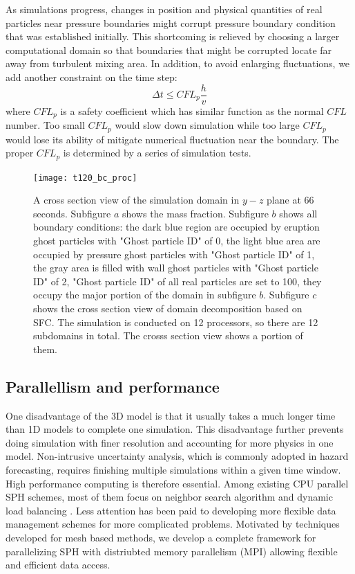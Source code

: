 \documentclass[gmd, manuscript]{copernicus}
\begin{document}
As simulations progress, changes in position and physical quantities of real particles near pressure boundaries might corrupt pressure boundary condition that was established initially. This shortcoming is relieved by choosing a larger computational domain so that boundaries that might be corrupted locate far away from turbulent mixing area. In addition, to avoid enlarging fluctuations, we add another constraint on the time step: 
\begin{equation}
\Delta t \leq CFL_p \dfrac{h}{v}
\end{equation}
where $CFL_p$ is a safety coefficient which has similar function as the normal $CFL$ number. Too small $CFL_p$ would slow down simulation while too large $CFL_p$ would lose its ability of mitigate numerical fluctuation near the boundary. The proper $CFL_p$ is determined by a series of simulation tests.

\begin{figure}
\texttt{[image: t120\_bc\_proc]}
\caption{A cross section view of the simulation domain in $y-z$ plane at 66 seconds. Subfigure $a$ shows the mass fraction. Subfigure $b$ shows all boundary conditions: the dark blue region are occupied by eruption ghost particles with "Ghost particle ID" of 0, the light blue area are occupied by pressure ghost particles with "Ghost particle ID" of 1, the gray area is filled with wall ghost particles with "Ghost particle ID" of 2, "Ghost particle ID" of all real particles are set to 100, they occupy the major portion of the domain in subfigure $b$. Subfigure $c$ shows the cross section view of domain decomposition based on SFC. The simulation is conducted on 12 processors, so there are 12 subdomains in total. The crosss section view shows a portion of them.}
\label{fig:bc_and_domain_decomp}
\end{figure}

\subsection{Parallellism and performance}
One disadvantage of the 3D model is that it usually takes a much longer time than 1D models to complete one simulation. This disadvantage further prevents doing simulation with finer resolution and accounting for more physics in one model. Non-intrusive uncertainty analysis, which is commonly adopted in hazard forecasting, requires finishing multiple simulations within a given time window. High performance computing is therefore essential. Among existing CPU parallel SPH schemes, most of them focus on neighbor search algorithm and dynamic load balancing \citep {ferrari2009new, crespo2015dualsphysics}. Less attention has been paid to developing more flexible data management schemes for more complicated problems. Motivated by techniques developed for mesh based methods, we develop a complete framework for parallelizing SPH with distriubted memory parallelism (MPI) allowing flexible and efficient data access.
\end{document}
